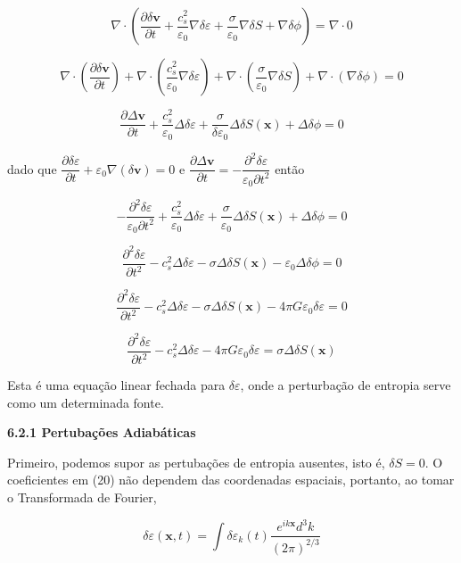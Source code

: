 \documentclass[a4paper,12pt]{article}
\begin{document}
$$\nabla\cdot \left( \dfrac{\partial\delta\textbf{v}}{\partial t} + \dfrac{c^2_s}{\varepsilon_0} \nabla\delta\varepsilon + \dfrac{\sigma}{\varepsilon_0}\nabla\delta S + \nabla\delta\phi \right)= \nabla\cdot 0$$

$$\nabla\cdot \left( \dfrac{\partial\delta\textbf{v}}{\partial t} \right) + \nabla\cdot \left( \dfrac{c^2_s}{\varepsilon_0} \nabla\delta\varepsilon \right) +\nabla\cdot \left( \dfrac{\sigma}{\varepsilon_0}\nabla\delta S \right) + \nabla\cdot \left( \nabla\delta\phi \right) = 0$$

$$\dfrac{\partial\Delta\textbf{v}}{\partial t} + \dfrac{c^2_s}{\varepsilon_0} \Delta\delta\varepsilon  + \dfrac{\sigma}{\delta\varepsilon_0}\Delta\delta S (\textbf{x})+  \Delta\delta\phi = 0$$

dado que $\dfrac{\partial\delta\varepsilon}{\partial t} + \varepsilon_0 \nabla (\delta\textbf{v}) = 0$ e $\dfrac{\partial\Delta\textbf{v}}{\partial t}= - \dfrac{\partial^2\delta\varepsilon}{\varepsilon_0\partial t^2} $ então

$$- \dfrac{\partial^2\delta\varepsilon}{\varepsilon_0\partial t^2}+\dfrac{c^2_s}{\varepsilon_0} \Delta\delta\varepsilon  + \dfrac{\sigma}{\varepsilon_0}\Delta\delta S (\textbf{x})+  \Delta\delta\phi = 0$$

$$\dfrac{\partial^2\delta\varepsilon}{\partial t^2}-c^2_s \Delta\delta\varepsilon  -\sigma\Delta\delta S (\textbf{x})-  \varepsilon_0\Delta\delta\phi = 0$$

$$\dfrac{\partial^2\delta\varepsilon}{\partial t^2}-c^2_s \Delta\delta\varepsilon  -\sigma\Delta\delta S (\textbf{x})-  4\pi G\varepsilon_0\delta\varepsilon = 0$$

\begin{equation}
	\dfrac{\partial^2\delta\varepsilon}{\partial t^2} - c^2_s\Delta\delta\varepsilon - 4\pi G\varepsilon_0\delta\varepsilon = \sigma\Delta\delta S(\textbf{x})
\end{equation}

Esta é uma equação linear fechada para $\delta\varepsilon$, onde a perturbação de entropia serve como um
determinada fonte.

\begin{center}
	\textbf{6.2.1 Pertubações Adiabáticas}
\end{center}
Primeiro, podemos supor as pertubações de entropia ausentes, isto é, $\delta S=0$. O
coeficientes em (20) não dependem das coordenadas espaciais, portanto, ao tomar o
Transformada de Fourier,

\begin{equation}
	\delta\varepsilon (\textbf{x} , t ) = \int \delta\varepsilon_k (t)  \dfrac{e^{ik\textbf{x}}d^3 k}{(2\pi)^{2/3}}
\end{equation}
\end{document}
